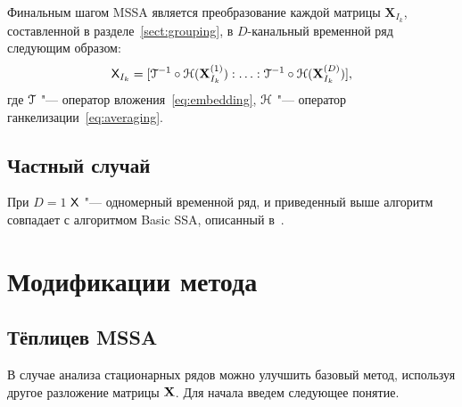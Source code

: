 \documentclass[specialist,
substylefile = spbu_report.rtx,
subf,href,colorlinks=true, 12pt]{disser}
\newcommand{\traj}{\mathbf{X}}
\theoremstyle{definition}
\begin{document}
	
	
	
	
	
	Финальным шагом MSSA является преобразование каждой матрицы $\traj_{I_k}$, составленной в разделе~\ref{sect:grouping}, в $D$-канальный временной ряд следующим образом:
	\begin{equation}
		\mathsf{X}_{I_k}=[\EuScript{T}^{-1}\circ\EuScript{H}(\mathbf{X}_{I_k}^{(1)}):\ldots:\EuScript{T}^{-1}\circ\EuScript{H}(\mathbf{X}_{I_k}^{(D)})],
	\end{equation}
	где $\EuScript{T}$ "--- оператор вложения~\eqref{eq:embedding}, $\EuScript{H}$ "--- оператор ганкелизации~\eqref{eq:averaging}.
	
	
	\subsection{Частный случай}
	При $D=1$ $\mathsf{X}$ "--- одномерный временной ряд, и приведенный выше алгоритм совпадает с алгоритмом Basic SSA, описанный в~\cite{ssa_an}.
	
	\section{Модификации метода}
	\subsection{Тёплицев MSSA}\label{toeplitz}
	В случае анализа стационарных рядов можно улучшить базовый метод, используя другое разложение матрицы $\mathbf{X}$. Для начала введем следующее понятие.
	
\end{document}
